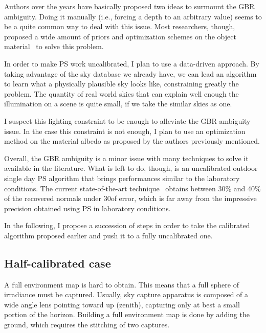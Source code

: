 Authors over the years have basically proposed two ideas to surmount the GBR ambiguity. Doing it manually (i.e., forcing a depth to an arbitrary value) seems to be a quite common way to deal with this issue. Most researchers, though, proposed a wide amount of priors and optimization schemes on the object material~\cite{tan-cvpr-07,alldrin-cvpr-08,abrams-eccv-12,queau-jmiv-14} to solve this problem.

In order to make PS work uncalibrated, I plan to use a data-driven approach. By taking advantage of the sky database we already have, we can lead an algorithm to learn what a physically plausible sky looks like, constraining greatly the problem. The quantity of real world skies that can explain well enough the illumination on a scene is quite small, if we take the similar skies as one.

I suspect this lighting constraint to be enough to alleviate the GBR ambiguity issue. In the case this constraint is not enough, I plan to use an optimization method on the material albedo as proposed by the authors previously mentioned.

Overall, the GBR ambiguity is a minor issue with many techniques to solve it available in the literature. What is left to do, though, is an uncalibrated outdoor single day PS algorithm that brings performances similar to the laboratory conditions. The current state-of-the-art technique~\cite{jung-cvpr-15} obtains between 30\% and 40\% of the recovered normals under 30\degree of error, which is far away from the impressive precision obtained using PS in laboratory conditions.

In the following, I propose a succession of steps in order to take the calibrated algorithm proposed earlier and push it to a fully uncalibrated one.


\subsection{Half-calibrated case}
A full environment map is hard to obtain. This means that a full sphere of irradiance must be captured. Usually, sky capture apparatus is composed of a wide angle lens pointing toward up (zenith), capturing only at best a small portion of the horizon. Building a full environment map is done by adding the ground, which requires the stitching of two captures.

